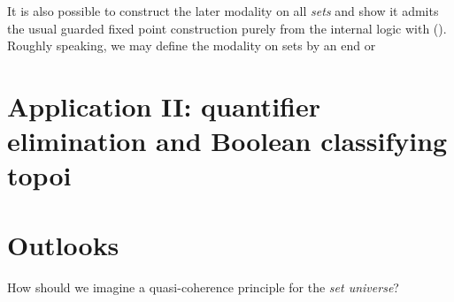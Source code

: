 \begin{remark}
  It is also possible to construct the later modality on all \emph{sets} and show it admits the usual guarded fixed point construction purely from the internal logic with (\AxiomGR). Roughly speaking, we may define the modality on sets by an end or 
\end{remark}

\section{Application II: quantifier elimination and Boolean classifying topoi}

\begin{definition}
  
\end{definition}

\section{Outlooks}

How should we imagine a quasi-coherence principle for the \emph{set universe}?